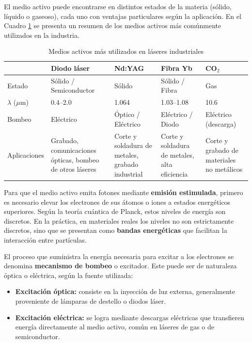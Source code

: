 El medio activo puede encontrarse en distintos estados de la materia (sólido, líquido o gaseoso), cada uno con ventajas particulares según la aplicación. En el Cuadro \ref{tab:medios} se presenta un resumen de los medios activos más comúnmente utilizados en la industria.

\begin{table}[h!]
	\centering
	\small
	\caption{Medios activos más utilizados en láseres industriales}
	\label{tab:medios}
	\begin{tabular}{|l|p{3cm}|p{3cm}|p{3cm}|p{3cm}|}
		\hline
		& \textbf{Diodo láser} & \textbf{Nd:YAG} & \textbf{Fibra Yb} & \textbf{CO$_2$} \\ \hline
		Estado & Sólido / Semiconductor & Sólido & Sólido / Fibra & Gas \\ \hline
		$\lambda$ ($\mu$m) & 0.4–2.0 & 1.064 & 1.03–1.08 & 10.6 \\ \hline
		Bombeo & Eléctrico & Óptico / Eléctrico & Eléctrico / Diodo & Eléctrico (descarga) \\ \hline
		Aplicaciones & Grabado, comunicaciones ópticas, bombeo de otros láseres & Corte y soldadura de metales, grabado industrial & Corte y soldadura de metales, alta eficiencia & Corte y grabado de materiales no metálicos \\ \hline
	\end{tabular}
\end{table}


Para que el medio activo emita fotones mediante \textbf{emisión estimulada}, primero es necesario elevar los electrones de sus átomos o iones a estados energéticos superiores. Según la teoría cuántica de Planck, estos niveles de energía son discretos. En la práctica, en materiales reales los niveles no son estrictamente discretos, sino que se presentan como \textbf{bandas energéticas} que facilitan la interacción entre partículas.

El proceso que suministra la energía necesaria para excitar a los electrones se denomina \textbf{mecanismo de bombeo} o excitador. Este puede ser de naturaleza óptica o eléctrica, según la fuente utilizada:

\begin{itemize}
	\item \textbf{Excitación óptica:} consiste en la inyección de luz externa, generalmente proveniente de lámparas de destello o diodos láser.
	\item \textbf{Excitación eléctrica:} se logra mediante descargas eléctricas que transfieren energía directamente al medio activo, común en láseres de gas o de semiconductor.
\end{itemize}

